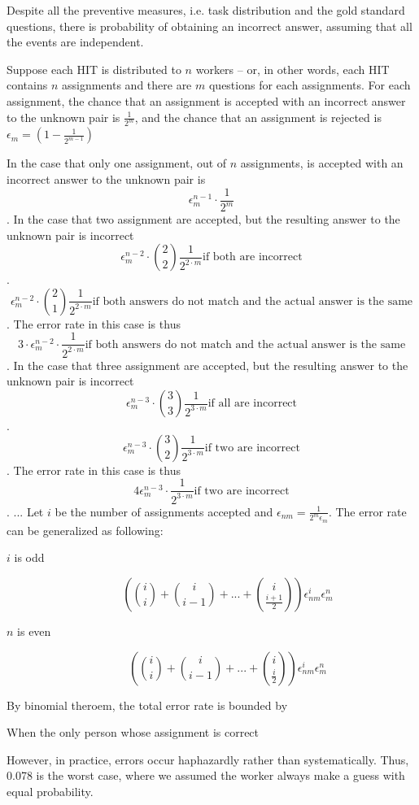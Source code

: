 Despite all the preventive measures, i.e. task distribution and the gold standard
questions, there is probability of obtaining an incorrect answer, assuming
that all the events are independent.

Suppose each HIT is distributed to $n$ workers -- or, in other words, each HIT
contains $n$ assignments and there are $m$ questions for each assignments.
For each assignment, the chance that an assignment is accepted with
an incorrect answer to the unknown pair is $\frac{1}{2^m}$, and the chance
that an assignment is rejected is $\epsilon_m = (1-\frac{1}{2^{m-1}})$

In the case that only one assignment, out of $n$ assignments, is accepted with
an incorrect answer to the unknown pair is
$$\epsilon_m^{n-1} \cdot \frac{1}{2^m}$$.
In the case that two assignment are accepted, but the resulting answer to the
unknown pair is incorrect
$$\epsilon_m^{n-2} \cdot \binom{2}{2}\frac{1}{2^{2\cdot m}} \mbox{if both are incorrect}$$.
$$\epsilon_m^{n-2} \cdot \binom{2}{1}\frac{1}{2^{2\cdot m}} \mbox{if both answers do not match and the actual answer is the same}$$.
The error rate in this case is thus
$$3 \cdot \epsilon_m^{n-2} \cdot \frac{1}{2^{2\cdot m}} \mbox{if both answers do not match and the actual answer is the same}$$.
In the case that three assignment are accepted, but the resulting answer to the
unknown pair is incorrect
$$\epsilon_m^{n-3} \cdot \binom{3}{3}\frac{1}{2^{3\cdot m}} \mbox{if all are incorrect}$$.
$$\epsilon_m^{n-3} \cdot \binom{3}{2}\frac{1}{2^{3\cdot m}} \mbox{if two are incorrect}$$.
The error rate in this case is thus
$$4 \epsilon_m^{n-3} \cdot \frac{1}{2^{3\cdot m}} \mbox{if two are incorrect}$$.
...
Let $i$ be the number of assignments accepted and 
$\epsilon_{nm} = \frac{1}{2^m\epsilon_m}$.
The error rate can be generalized as following:
\begin{description}
  \item[$i$ is odd]
  $$(\binom{i}{i} + \binom{i}{i-1} + ... + \binom{i}{\frac{i+1}{2}})\epsilon_{nm}^i \epsilon_m^n$$
  \item[$n$ is even]
  $$(\binom{i}{i} + \binom{i}{i-1} + ... + \binom{i}{\frac{i}{2}})\epsilon_{nm}^i \epsilon_m^n$$
\end{description}
By binomial theroem, the total error rate is bounded by



When the only person whose assignment is correct


However, in practice, errors occur haphazardly rather than systematically.
Thus, 0.078 is the worst case, where we assumed the worker always make a guess 
with equal probability.

